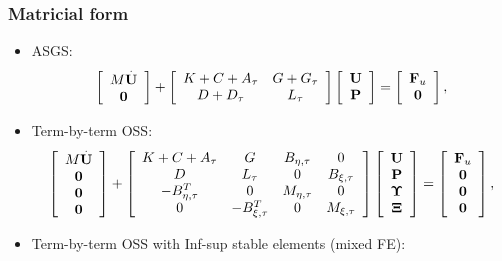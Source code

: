 \begin{frame}
\frametitle{Matricial form}
\begin{itemize}
\item<1-> ASGS:
\begin{equation*}
\left[\begin{array}{c}
M\overset{.}{{\bf U}}\\
\mathbf{0}
\end{array}\right]+\left[\begin{array}{cc}
K+C+A_\tau&G+G_\tau\\
D+D_\tau&L_\tau
\end{array}\right]\left[\begin{array}{c}
{\bf U}\\
{\bf P}
\end{array}\right]=\left[\begin{array}{c}
{\bf F}_u\\
\mathbf{0}
\end{array}\right],
\end{equation*}
\item<2-> Term-by-term OSS:
\begin{equation*}
\left[\begin{array}{c}
M\overset{.}{{\bf U}}\\
\mathbf{0}\\
\mathbf{0}\\
\mathbf{0}
\end{array}\right]+\left[\begin{array}{cccc}
K+C+A_\tau&G&B_{\eta,\tau}&0\\
D&L_\tau&0&B_{\xi,\tau}\\
-B_{\eta,\tau}^T&0&M_{\eta,\tau}&0\\
0&-B_{\xi,\tau}^T&0&M_{\xi,\tau}
\end{array}\right]\left[\begin{array}{c}
{\bf U}\\
{\bf P}\\
\boldsymbol{\Upsilon}\\
{\boldsymbol{\Xi}}
\end{array}\right]=\left[\begin{array}{c}
{\bf F}_u\\
\mathbf{0}\\
\mathbf{0}\\
\mathbf{0}
\end{array}\right],
\end{equation*}
\item<3-> Term-by-term OSS with Inf-sup stable elements (mixed FE):

\end{itemize}
\end{frame}
